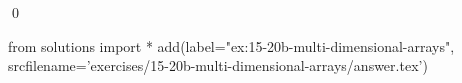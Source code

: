 
\begin{ex} 
  \label{ex:15-20b-multi-dimensional-arrays}
  
  \qed
\end{ex} 
\begin{python0}
from solutions import *
add(label="ex:15-20b-multi-dimensional-arrays",
    srcfilename='exercises/15-20b-multi-dimensional-arrays/answer.tex') 
\end{python0}

